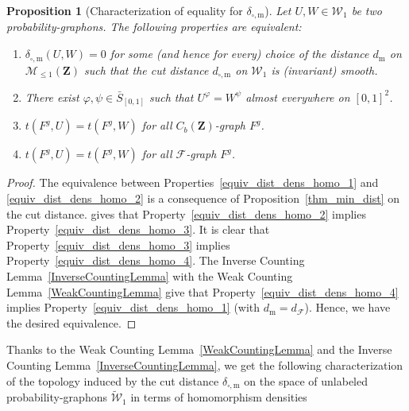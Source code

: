 \documentclass{amsart}
\theoremstyle{plain}
\newtheorem{prop}[Th]{Proposition}
\theoremstyle{definition}
\newcommand{\Space}{\mathbf{Z}}
\newcommand{\SubProba}{\mathcal{M}_{\leq1}(\Space)}
\newcommand{\CbFunct}{C_b(\Space)}
\newcommand{\Graphon}{\mathcal{W}_1}
\newcommand{\UGraphon}{\widetilde{\mathcal{W}}_1}
\newcommand{\Relabel}{\bar{S}_{[0,1]}}
\newcommand{\m}{\mathrm{m}}
\newcommand{\dmeas}{d_\m}
\newcommand{\dcut}{d_{\square,\m}}
\newcommand{\ddcut}{\delta_{\square,\m}}
\newcommand{\dmeasF}{d_{\mathcal{F}}}
\newcommand{\F}{\mathcal{F}}
\begin{document}
\begin{prop}[Characterization of equality for $\ddcut$]
	\label{prop_equiv_dist_dens_homo}
Let $U,W\in\Graphon$ be two probability-graphons.
The following properties are equivalent:
\begin{enumerate}[label=(\roman*)]
\item\label{equiv_dist_dens_homo_1} 
$\ddcut(U,W) =0$ for some (and hence for every) choice 
of the distance $\dmeas$ on $\SubProba$
such that the cut distance $\dcut$ on $\Graphon$
is (invariant) smooth.

\item\label{equiv_dist_dens_homo_2}
There exist $\varphi, \psi \in \Relabel$
such that $U^\varphi = W^\psi$ almost everywhere
	on $[0,1]^2$.

\item\label{equiv_dist_dens_homo_3}
$t(F^g,U)=t(F^g,W)$ 
for all $\CbFunct$-graph $F^g$.

\item\label{equiv_dist_dens_homo_4}
$t(F^g,U)=t(F^g,W)$ 
for all $\F$-graph $F^g$.

\end{enumerate}
\end{prop}


\begin{proof}
The equivalence between Properties~\ref{equiv_dist_dens_homo_1} 
and \ref{equiv_dist_dens_homo_2} is a consequence of
Proposition~\ref{thm_min_dist} on the cut distance.
 gives that Property~\ref{equiv_dist_dens_homo_2} 
	implies Property~\ref{equiv_dist_dens_homo_3}.
It is clear that Property~\ref{equiv_dist_dens_homo_3} 
	implies Property~\ref{equiv_dist_dens_homo_4}.
The Inverse Counting Lemma~\ref{InverseCountingLemma}
with the Weak Counting Lemma~\ref{WeakCountingLemma}
give that Property~\ref{equiv_dist_dens_homo_4} 
	implies Property~\ref{equiv_dist_dens_homo_1} 
	(with $\dmeas=\dmeasF$).
Hence, we have the desired equivalence.
\end{proof}

Thanks to the Weak Counting Lemma~\ref{WeakCountingLemma}
and the Inverse Counting Lemma~\ref{InverseCountingLemma},
we get the following characterization
of the topology induced by the cut distance $\ddcut$
on the space
of unlabeled probability-graphons $\UGraphon$
in terms of homomorphism densities
\end{document}
